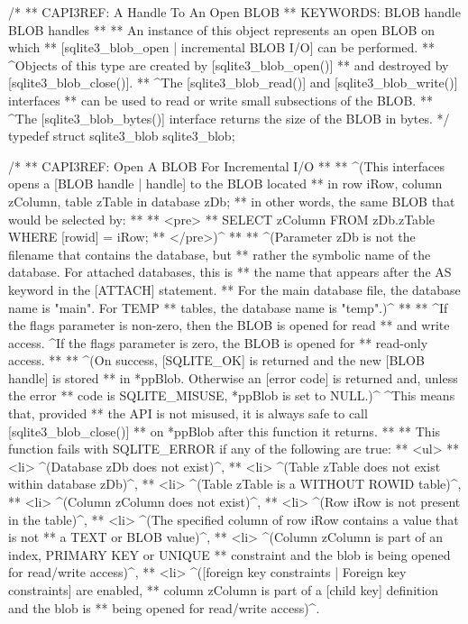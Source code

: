 \begin{Codex}[label=sqlite3.h,numbers=left]
{/*
** CAPI3REF: A Handle To An Open BLOB
** KEYWORDS: {BLOB handle} {BLOB handles}
**
** An instance of this object represents an open BLOB on which
** [sqlite3_blob_open | incremental BLOB I/O] can be performed.
** ^Objects of this type are created by [sqlite3_blob_open()]
** and destroyed by [sqlite3_blob_close()].
** ^The [sqlite3_blob_read()] and [sqlite3_blob_write()] interfaces
** can be used to read or write small subsections of the BLOB.
** ^The [sqlite3_blob_bytes()] interface returns the size of the BLOB in bytes.
*/
typedef struct sqlite3_blob sqlite3_blob;

/*
** CAPI3REF: Open A BLOB For Incremental I/O
**
** ^(This interfaces opens a [BLOB handle | handle] to the BLOB located
** in row iRow, column zColumn, table zTable in database zDb;
** in other words, the same BLOB that would be selected by:
**
** <pre>
**     SELECT zColumn FROM zDb.zTable WHERE [rowid] = iRow;
** </pre>)^
**
** ^(Parameter zDb is not the filename that contains the database, but 
** rather the symbolic name of the database. For attached databases, this is
** the name that appears after the AS keyword in the [ATTACH] statement.
** For the main database file, the database name is "main". For TEMP
** tables, the database name is "temp".)^
**
** ^If the flags parameter is non-zero, then the BLOB is opened for read
** and write access. ^If the flags parameter is zero, the BLOB is opened for
** read-only access.
**
** ^(On success, [SQLITE_OK] is returned and the new [BLOB handle] is stored
** in *ppBlob. Otherwise an [error code] is returned and, unless the error
** code is SQLITE_MISUSE, *ppBlob is set to NULL.)^ ^This means that, provided
** the API is not misused, it is always safe to call [sqlite3_blob_close()] 
** on *ppBlob after this function it returns.
**
** This function fails with SQLITE_ERROR if any of the following are true:
** <ul>
**   <li> ^(Database zDb does not exist)^, 
**   <li> ^(Table zTable does not exist within database zDb)^, 
**   <li> ^(Table zTable is a WITHOUT ROWID table)^, 
**   <li> ^(Column zColumn does not exist)^,
**   <li> ^(Row iRow is not present in the table)^,
**   <li> ^(The specified column of row iRow contains a value that is not
**         a TEXT or BLOB value)^,
**   <li> ^(Column zColumn is part of an index, PRIMARY KEY or UNIQUE 
**         constraint and the blob is being opened for read/write access)^,
**   <li> ^([foreign key constraints | Foreign key constraints] are enabled, 
**         column zColumn is part of a [child key] definition and the blob is
**         being opened for read/write access)^.
}
\end{Codex}
